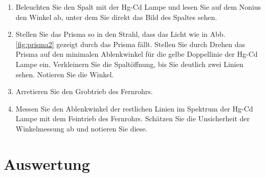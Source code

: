 \begin{enumerate}
%
%
	\item Beleuchten Sie den Spalt mit der Hg-Cd Lampe und lesen Sie auf dem Nonius den Winkel ab, unter dem Sie direkt das Bild des Spaltes sehen. \label{task:Spaltbild}
	\item Stellen Sie das Prisma so in den Strahl, dass das Licht wie in Abb. \ref{fig:prisma2} gezeigt durch das Prisma fällt. Stellen Sie durch Drehen das Prisma auf den minimalen Ablenkwinkel für die gelbe Doppellinie der Hg-Cd Lampe ein. Verkleinern Sie die Spaltöffnung, bis Sie deutlich zwei Linien sehen. Notieren Sie die Winkel.
	\item Arretieren Sie den Grobtrieb des Fernrohrs. 
	\item Messen Sie den Ablenkwinkel der restlichen Linien im Spektrum der Hg-Cd Lampe mit dem Feintrieb des Fernrohrs. Schätzen Sie die Unsicherheit der Winkelmessung ab und notieren Sie diese. \label{task:HgSpektrum}
\end{enumerate}

\section{Auswertung} 

